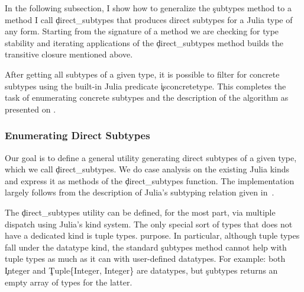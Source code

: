 In the following subsection, I show how to generalize the \c{subtypes} method to
a method I call \c{direct_subtypes} that produces direct subtypes for a Julia
type of any form. Starting from the signature of a method we are checking for
type stability and iterating applications of the \c{direct_subtypes} method
builds the transitive closure mentioned above.

After getting all subtypes of a given type, it is possible to filter for concrete
subtypes using the built-in Julia predicate \c{isconcretetype}. This completes
the task of enumerating concrete subtypes and the description of the algorithm
as presented on .


\subsubsection{Enumerating Direct Subtypes}

Our goal is to define a general utility generating direct subtypes of a given
type, which we call \c{direct_subtypes}.
We do case analysis on the existing Julia kinds and express it as methods
of the \c{direct_subtypes} function. The implementation largely follows from the
description of Julia's subtyping relation given in~\cite{oopsla18b}.

The \c{direct_subtypes} utility can be defined, for the most part, via multiple dispatch
using Julia's kind system.
The only special sort of types that does not have a dedicated kind is tuple types.
purpose. In particular, although tuple types fall under the datatype kind,
the standard \c{subtypes} method cannot help with tuple types as much as it can with user-defined datatypes.
For example:
both \c{Integer} and \c{Tuple\{Integer, Integer\}} are datatypes, but
\c{subtypes} returns an empty array of types for the latter.

%

